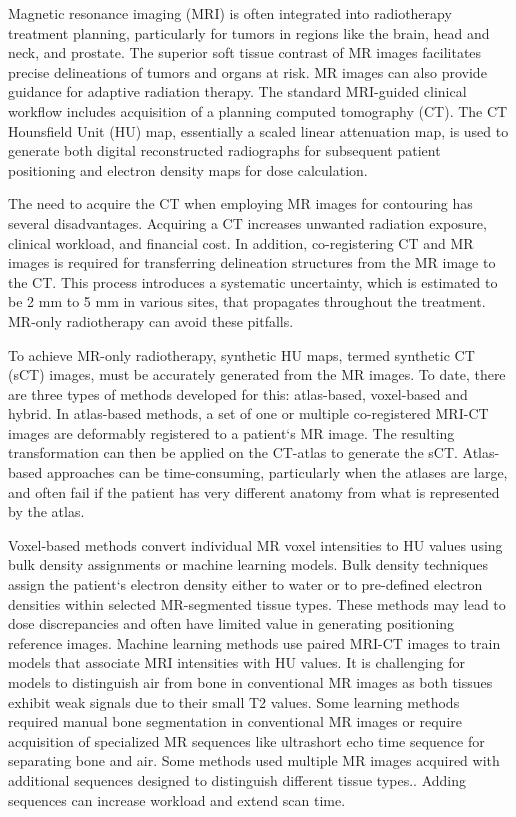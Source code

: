 \label{sect:intro}
Magnetic resonance imaging (MRI) is often integrated into radiotherapy treatment planning\cite{RN1}, particularly for tumors in regions like the brain, head and neck, and prostate\cite{RN2}. The superior soft tissue contrast of MR images facilitates precise delineations of tumors and organs at risk\cite{RN3,RN4}. MR images can also provide guidance for adaptive radiation therapy\cite{RN5,RN6}. The standard MRI-guided clinical workflow includes acquisition of a planning computed tomography (CT). The CT Hounsfield Unit (HU) map, essentially a scaled linear attenuation map, is used to generate both digital reconstructed radiographs for subsequent patient positioning and electron density maps for dose calculation. 

The need to acquire the CT when employing MR images for contouring has several disadvantages. Acquiring a CT increases unwanted radiation exposure, clinical workload, and financial cost\cite{RN7}. In addition, co-registering CT and MR images is required for transferring delineation structures from the MR image to the CT. This process introduces a systematic uncertainty, which is estimated to be 2 mm to 5 mm in various sites, that propagates throughout the treatment\cite{RN8}. MR-only radiotherapy can avoid these pitfalls. 

To achieve MR-only radiotherapy, synthetic HU maps, termed synthetic CT (sCT) images, must be accurately generated from the MR images. To date, there are three types of methods developed for this: atlas-based, voxel-based and hybrid\cite{RN8}. In atlas-based methods, a set of one or multiple co-registered MRI-CT images are deformably registered to a patient`s MR image\cite{RN9,RN10,RN11}. The resulting transformation can then be applied on the CT-atlas to generate the sCT. Atlas-based approaches can be time-consuming, particularly when the atlases are large, and often fail if the patient has very different anatomy from what is represented by the atlas. 

Voxel-based methods convert individual MR voxel intensities to HU values using bulk density assignments or machine learning models. Bulk density techniques assign the patient`s electron density either to water or to pre-defined electron densities within selected MR-segmented tissue types.\cite{RN12,RN13,RN14,RN15} These methods may lead to dose discrepancies and often have limited value in generating positioning reference images. Machine learning methods use paired MRI-CT images to train models that associate MRI intensities with HU values. It is challenging for models to distinguish air from bone in conventional MR images as both tissues exhibit weak signals due to their small T2 values. Some learning methods required manual bone segmentation\cite{RN16,RN17} in conventional MR images or require acquisition of specialized MR sequences like ultrashort echo time sequence\cite{RN18,RN19,RN20} for separating bone and air. Some methods used multiple MR images acquired with additional sequences designed to distinguish different tissue types.\cite{RN21,RN22,RN23}. Adding sequences can increase workload and extend scan time. 

